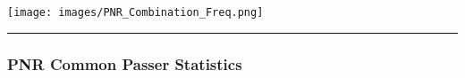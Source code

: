 \documentclass[a4paper,12pt]{article}
\begin{document}
\begin{table}[H]
{\begin{minipage}[t]{0.6\textwidth}
{\begin{tabular}
            
                

            
                

            
                

            
                

            
                

            
                

            

            \bottomrule
        \end{tabular}
        } %
    \end{minipage}
    } %
    \hfill %
    \begin{minipage}[c]{0.35\textwidth} %
        \flushright
        \texttt{[image: images/PNR\_Combination\_Freq.png]} %
    \end{minipage}
\end{table}

\vspace{-1em} %
\hrule height 1pt width 1\textwidth %
\vspace{1em} %

\subsubsection{PNR Common Passer Statistics}
\end{document}

